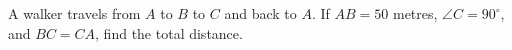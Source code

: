 A walker travels from $A$ to $B$ to $C$ and back to $A$. If $AB=50$ metres, $\angle C=90^\circ$, and $BC=CA$, find the total distance.

